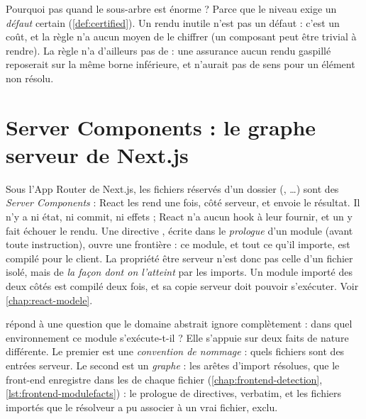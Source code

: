 \begin{remarque}
Pourquoi pas \Error{} quand le sous-arbre est énorme ? Parce que le niveau \Error{} exige un
\emph{défaut} certain (\cref{def:certified}). Un rendu inutile n'est pas un défaut : c'est un
coût, et la règle n'a aucun moyen de le chiffrer (un composant peut être trivial à rendre). La
règle n'a d'ailleurs pas de  : une assurance \og aucun rendu gaspillé\fg{}
reposerait sur la même borne inférieure, et n'aurait pas de sens pour un élément non résolu.
\end{remarque}

\section{Server Components : le graphe serveur de Next.js}
\label{sec:regles-rendu-rsc-graphe}

\begin{react}
Sous l'App Router de Next.js, les fichiers réservés d'un dossier  (,
\dots) sont des \emph{Server Components} : React les rend une fois, côté
serveur, et envoie le résultat. Il n'y a ni état, ni commit, ni effets ; React n'a aucun hook à
leur fournir, et un  y fait échouer le rendu. Une directive ,
écrite dans le \emph{prologue} d'un module (avant toute instruction), ouvre une frontière :
ce module, et tout ce qu'il importe, est compilé pour le client. La propriété \og être serveur\fg{}
n'est donc pas celle d'un fichier isolé, mais de \emph{la façon dont on l'atteint} par les
imports. Un module importé des deux côtés est compilé deux fois, et sa copie serveur doit
pouvoir s'exécuter. Voir \cref{chap:react-modele}.
\end{react}

 répond à une question que le domaine abstrait ignore
complètement : dans quel environnement ce module s'exécute-t-il ? Elle s'appuie sur deux faits
de nature différente. Le premier est une \emph{convention de nommage} : quels fichiers sont des
entrées serveur. Le second est un \emph{graphe} : les arêtes d'import résolues, que le front-end
enregistre dans les  de chaque fichier (\cref{chap:frontend-detection},
\cref{lst:frontend-modulefacts}) : le prologue de directives, verbatim, et les fichiers importés
que le résolveur a pu associer à un vrai fichier,  exclu.

